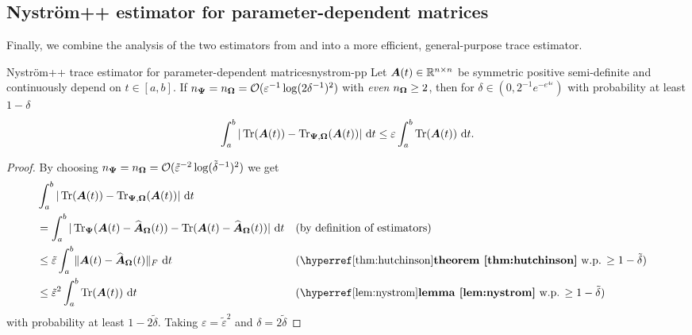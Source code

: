 \documentclass[12pt]{article}
\begin{document}
\subsection{Nyström++ estimator for parameter-dependent matrices}
\label{subsec:nystrom-pp}

Finally, we combine the analysis of the two estimators from  and  into a more efficient, general-purpose trace estimator.

\begin{theorem}{Nyström++ trace estimator for parameter-dependent matrices}{nystrom-pp}
    Let $\boldsymbol{A}(t) \in \mathbb{R}^{n \times n}$ be symmetric positive semi-definite and continuously depend on $t \in [a, b]$. If $n_{\boldsymbol{\Psi}} = n_{\boldsymbol{\Omega}} = \mathcal{O}(\varepsilon^{-1} \log(2\delta^{-1})^2)$ with \emph{even} $n_{\boldsymbol{\Omega}} \geq 2$, then for $\delta \in (0, 2^{-1} e^{-e^{4\varepsilon}})$ with probability at least $1 - \delta$
    \begin{equation}
        \int_{a}^{b} | \operatorname{Tr}(\boldsymbol{A}(t)) - \operatorname{Tr}_{\boldsymbol{\Psi}, \boldsymbol{\Omega}}(\boldsymbol{A}(t)) |~\mathrm{d}t
        \leq \varepsilon \int_{a}^{b} \operatorname{Tr}(\boldsymbol{A}(t))~\mathrm{d}t.
    \end{equation}
\end{theorem}

\begin{proof}
    By choosing $n_{\boldsymbol{\Psi}} = n_{\boldsymbol{\Omega}} = \mathcal{O}(\tilde{\varepsilon}^{-2} \log(\tilde{\delta}^{-1})^2)$ we get
    \begin{align}
        &\int_{a}^{b} | \Trace(\mtx{A}(t)) - \Nystrpp{\mtx{\Omega}}{\mtx{\Psi}}(\mtx{A}(t)) |~\mathrm{d}t \notag \\
        &= \int_{a}^{b} | \Hutch{\mtx{\Psi}}(\mtx{A}(t) - \Nystr{\mtx{\Omega}}{\mtx{A}}(t)) - \Trace(\mtx{A}(t) - \Nystr{\mtx{\Omega}}{\mtx{A}}(t)) |~\mathrm{d}t && \text{(by definition of estimators)} \notag \\
        &\leq \tilde{\varepsilon} \int_{a}^{b} \lVert \mtx{A}(t) - \Nystr{\mtx{\Omega}}{\mtx{A}}(t) \rVert _F ~\mathrm{d}t && \text{(\refthm{thm:hutchinson} w.p. $\geq 1 - \tilde{\delta}$)} \notag \\
        &\leq \tilde{\varepsilon}^2 \int_{a}^{b} \Trace(\mtx{A}(t)) ~\mathrm{d}t && \text{(\reflem{lem:nystrom} w.p. $\geq 1 - \tilde{\delta}$)} 
    \end{align}
    with probability at least $1 - 2\tilde{\delta}$. Taking $\varepsilon = \tilde{\varepsilon}^2$ and $\delta = 2 \tilde{\delta}$
\end{proof}
\end{document}
